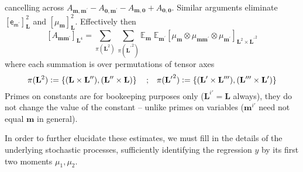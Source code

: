 \documentclass[preprint,12pt]{elsarticle}
\newcommand*{\M}[1]{\ensuremath{#1}\xspace}
\newcommand*{\x}{\times}
\newcommand*{\mi}[1]{\mathbf{#1}}
\newcommand*{\rv}[1]{\mathsf{#1}}
\newcommand*{\te}[2][]{\left\lbrack{#2}\right\rbrack_{#1}}
\newcommand*{\deq}{\M{\mathrel{\mathop:}=}}
\newcommand{\T}[1]{\text{#1}}
\newcommand*{\QT}[2][]{\M{\quad\T{#2}\ifthenelse{\equal{#1}{}}{\quad}{#1}}}
\newcommand*{\evt}[3][]{\mathbb{E}_{#3}^{#1}\!#2}
\newcommand*{\set}[1]{\M{\left\lbrace{#1}\right\rbrace}}
\begin{document}
    cancelling across $A_{\mi{m,m^{\prime}}}-A_{\mi{0,m^{\prime}}} - A_{\mi{m,0}}+A_{\mi{0,0}}$.
    Similar arguments eliminate $\te[\mi{L}]{\rv{e_{m^{\prime}}}}^{2}$ and $\te[\mi{L}]{\mu_{\mi{m}}}^{2}$.
    Effectively then
    \begin{equation}\label{eq:SPEst:A}
        \te[\mi{L}^4]{A_{\mi{mm^{\prime}}}} = \sum_{\pi(\mi{L}^{2})} \sum_{\pi(\mi{L^{\prime}}^{2})}
        \evt{\;\evt{\te[\mi{L}^{2} \x \mi{L^{\prime}}^{2}]{\mu_{\mi{m}} \otimes \mu_{\mi{mm^{\prime}}} \otimes \mu_{\mi{m^{\prime}}}}}{\mi{m^{\prime}}}}{\mi{m}}
    \end{equation}
    where each summation is over permutations of tensor axes
    \begin{equation*}
        \pi(\mi{L}^{2}) \deq \set{(\mi{L}\x\mi{L^{\prime\prime}}), (\mi{L^{\prime\prime}}\x\mi{L})} \QT{;} \pi(\mi{L^{\prime}}^{2}) \deq \set{(\mi{L^{\prime}}\x\mi{L^{\prime\prime\prime}}), (\mi{L^{\prime\prime\prime}}\x\mi{L^{\prime}})}
    \end{equation*}
    Primes on constants are for bookeeping purposes only ($\mi{L}^{i\prime} = \mi{L}$ always), they do not change the value of the constant -- unlike primes on variables ($\mi{m}^{i\prime}$ need not equal $\mi{m}$ in general).

    In order to further elucidate these estimates, we must fill in the details of the underlying stochastic processes, sufficiently identifying the regression $y$ by its first two moments $\mu_{1}, \mu_{2}$.
\end{document}
